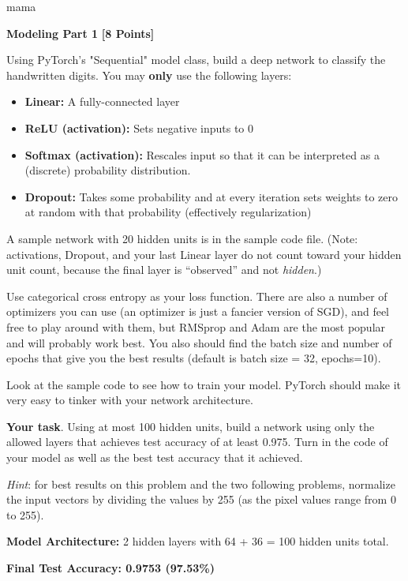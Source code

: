 mama
\newpage



 \problem \textbf{Modeling Part 1} \textbf{[8 Points]}

 Using PyTorch's "Sequential" model class, build a deep network to classify the handwritten digits. You may \textbf{only} use the following layers:

 \begin{itemize}
  \item \textbf{Linear:} A fully-connected layer
  \item \textbf{ReLU (activation):} Sets negative inputs to 0
  \item \textbf{Softmax (activation):} Rescales input so that it can be interpreted as a (discrete) probability distribution.
  \item \textbf{Dropout:} Takes some probability and at every iteration sets weights to zero at random with that probability (effectively regularization)
\end{itemize}

A sample network with 20 hidden units is in the sample code file. (Note: activations, Dropout, and your last Linear layer do not count toward your hidden unit count, because the final layer is ``observed'' and not \emph{hidden}.)

Use categorical cross entropy as your loss function. There are also a number of optimizers  you can use (an optimizer is just a fancier version of SGD), and feel free to play around with them, but RMSprop and Adam are the most popular and will probably work best. You also should find the batch size and number of epochs that give you the best results (default is batch size = 32, epochs=10).

Look at the sample code to see how to train your model. PyTorch should make it very easy to tinker with your network architecture.

\textbf{Your task}. Using at most 100 hidden units, build a network using only the allowed layers that achieves test accuracy of at least 0.975. Turn in the code of your model as well as the best test accuracy that it achieved.

\textit{Hint}: for best results on this problem and the two following problems, normalize the input vectors by dividing the values by 255 (as the pixel values range from 0 to 255).

\begin{solution}

\textbf{Model Architecture:} 2 hidden layers with 64 + 36 = 100 hidden units total.

\textbf{Final Test Accuracy: 0.9753 (97.53\%)}

\end{solution}


